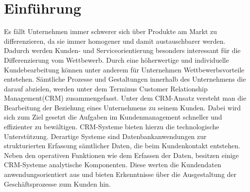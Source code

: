 
\chapter{Einführung}

Es fällt Unternehmen immer schwerer sich über Produkte am Markt zu differenzieren, da sie immer homogener und damit austauschbarer werden. Dadurch werden Kunden- und Serviceorientierung besonders interessant für die Differenzierung vom Wettbewerb. Durch eine höherwertige und individuelle Kundebearbeitung können unter anderem für Unternehmen Wettbewerbsvorteile entstehen. Sämtliche Prozesse und Gestaltungen innerhalb des Unternehmens die darauf abzielen, werden unter dem Terminus Customer Relationship Management(CRM) zusammengefasst. Unter dem CRM-Ansatz versteht man die Bearbeitung der Beziehung eines Unternehmens zu seinem Kunden. Dabei wird sich zum Ziel gesetzt die Aufgaben im Kundenmanagement schneller und effizienter zu bewältigen. CRM-Systeme bieten hierzu die technologische Unterstützung.  Derartige Systeme sind Datenbankanwendungen zur strukturierten Erfassung sämtlicher Daten, die beim Kundenkontakt entstehen. Neben den operativen Funktionen wie dem Erfassen der Daten, besitzen einige CRM-Systeme analytische Komponenten. Diese werten die Kundendaten anwendungsorientiert aus und bieten Erkenntnisse über die Ausgestaltung der Geschäftsprozesse zum Kunden hin.